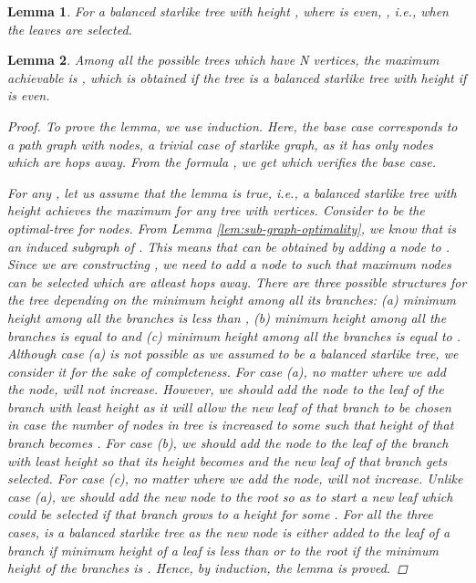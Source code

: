 \documentclass[letterpaper]{article} \usepackage{aaai20}  \usepackage{times}  \usepackage{helvet} \usepackage{courier}  \usepackage[hyphens]{url}  \usepackage{graphicx} \urlstyle{rm} \def\UrlFont{\rm}  \usepackage{graphicx}  \frenchspacing  \setlength{\pdfpagewidth}{8.5in}  \setlength{\pdfpageheight}{11in}
\newtheorem{lemma}{Lemma}
\begin{document}
	
	\begin{lemma}
		\label{lem:starlike-n}
		For a balanced starlike tree with height , where  is even, , i.e., when the leaves are selected.
	\end{lemma}
	
\begin{lemma}
		\label{lem:star}
		Among all the possible trees  which have N vertices, the maximum  achievable is , which is obtained if the tree is a balanced starlike tree with height  if  is even.
		\begin{proof} 
			 To prove the lemma, we use induction. Here, the base case corresponds to a path graph  with  nodes, a trivial case of starlike graph, as it has only  nodes which are  hops away. From the formula , we get  which verifies the base case.

			 For any , let us assume that the lemma is true, i.e., a balanced starlike tree with height  achieves the maximum  for any tree  with  vertices. Consider  to be the optimal-tree for  nodes. From Lemma \eqref{lem:sub-graph-optimality}, we know that  is an induced subgraph of . This means that  can be obtained by adding a node to . Since we are constructing , we need to add a node to  such that maximum nodes can be selected which are atleast  hops away. There are three possible structures for the tree  depending on the minimum height among all its branches: (a) minimum height among all the branches is less than , (b) minimum height among all the branches is equal to  and (c) minimum height among all the branches is equal to . Although case (a) is not possible as we assumed  to be a balanced starlike tree, we consider it for the sake of completeness. For case (a), no matter where we add the node,  will not increase. However, we should add the node to the leaf of the branch with least height as it will allow the new leaf of that branch to be chosen in case the number of nodes in tree is increased to some  such that height of that branch becomes . For case (b), we should add the node to the leaf of the branch with least height so that its height becomes  and the new leaf of that branch gets selected. For case (c), no matter where we add the node,  will not increase. Unlike case (a), we should add the new node to the root so as to start a new leaf which could be selected if that branch grows to a height  for some . For all the three cases,  is a balanced starlike tree as the new node is either added to the leaf of a branch if minimum height of a leaf is less than  or to the root if the minimum height of the branches is . Hence, by induction, the lemma is proved.


		\end{proof}
	\end{lemma}
\end{document}
